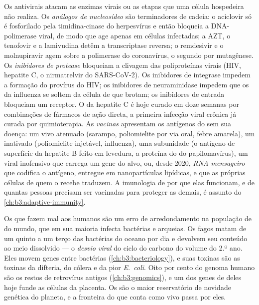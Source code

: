 \begin{definition}\label{def:b3:virology:drugs}
Os antivirais atacam as enzimas virais ou as etapas que uma célula
hospedeira não realiza. Os \emph{análogos de nucleosídeo} são
terminadores de cadeia: o aciclovir só é fosforilado pela
timidina-cinase do herpesvírus e então bloqueia a DNA-polimerase viral,
de modo que age apenas em células infectadas; a AZT, o tenofovir e a
lamivudina detêm a transcriptase reversa; o remdesivir e o
molnupiravir agem sobre a polimerase do coronavírus, o segundo por
mutagênese. Os \emph{inibidores de protease} bloqueiam a clivagem das
poliproteínas virais (HIV, hepatite C, o nirmatrelvir do SARS-CoV-2).
Os inibidores de integrase impedem a formação do provírus do HIV; os
inibidores de neuraminidase impedem que os  da influenza se
soltem da célula de que brotam; os inibidores de entrada bloqueiam um
receptor. O  da hepatite C é hoje curado em doze semanas por
combinações de fármacos de ação direta, a primeira infecção viral
crônica já curada por quimioterapia. As \emph{vacinas} apresentam os
antígenos do  sem sua doença: um  vivo atenuado (sarampo,
poliomielite por via oral, febre amarela), um  inativado
(poliomielite injetável, influenza), uma subunidade (o antígeno de
superfície da hepatite B feito em levedura, a proteína do  do
papilomavírus), um  viral inofensivo que carrega um gene do alvo,
ou, desde 2020, \emph{RNA mensageiro} que codifica o antígeno,
entregue em nanopartículas lipídicas, e que as próprias células de quem
o recebe traduzem. A imunologia de por que elas funcionam, e de quantas
pessoas precisam ser vacinadas para proteger as demais, é assunto do
\cref{ch:b3:adaptive-immunity}.
\end{definition}

\begin{remark}\label{rem:b3:virology:economy}
Os  que fazem mal aos humanos são um erro de arredondamento na
população de  do mundo, que em sua maioria infecta bactérias e
arqueias. Os fagos matam de um quinto a um terço das bactérias do
oceano por dia e devolvem seu conteúdo ao meio dissolvido --- o
\emph{desvio viral} do ciclo do carbono do volume do 2.º ano. Eles
movem genes entre bactérias (\cref{ch:b3:bacteriology}), e suas toxinas
são as toxinas da difteria, do cólera e da pior \emph{E.~coli}. Oito
por cento do genoma humano são os restos de retrovírus antigos
(\cref{ch:b3:genomics}), e um dos genes de  deles hoje funde as
células da placenta. Os  são o maior reservatório de novidade
genética do planeta, e a fronteira do que conta como vivo passa por
eles.
\end{remark}

